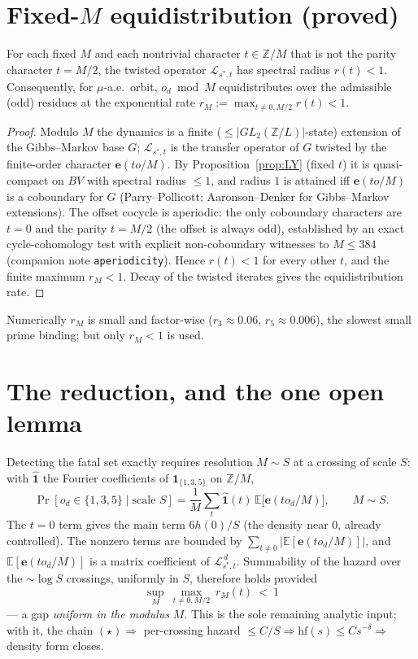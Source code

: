 \documentclass[11pt]{article}
\theoremstyle{definition}\newtheorem{definition}{Definition}
\theoremstyle{remark}\newtheorem{remark}{Remark}
\newcommand{\Z}{\mathbb{Z}}\newcommand{\Rr}{\mathbb{R}}\newcommand{\C}{\mathbb{C}}
\newcommand{\Lop}{\mathcal L}\newcommand{\var}{\operatorname{var}}\newcommand{\e}{\mathbf e}
\begin{document}
\section{Fixed-$M$ equidistribution (proved)}
\begin{proposition}\label{prop:fixedM}
For each fixed $M$ and each nontrivial character $t\in\Z/M$ that is not the
parity character $t=M/2$, the twisted operator $\Lop_{s^\ast,t}$ has spectral
radius $r(t)<1$. Consequently, for $\mu$-a.e.\ orbit, $o_d\bmod M$
equidistributes over the admissible (odd) residues at the exponential rate
$r_M:=\max_{t\neq0,M/2} r(t)<1$.
\end{proposition}
\begin{proof}
Modulo $M$ the dynamics is a finite ($\le|GL_2(\Z/L)|$-state) extension of the
Gibbs--Markov base $G$; $\Lop_{s^\ast,t}$ is the transfer operator of $G$
twisted by the finite-order character $\e(t o/M)$. By
Proposition~\ref{prop:LY} (fixed $t$) it is quasi-compact on $BV$ with
spectral radius $\le1$, and radius $1$ is attained iff $\e(t o/M)$ is a
coboundary for $G$ (Parry--Pollicott; Aaronson--Denker for Gibbs--Markov
extensions). The offset cocycle is aperiodic: the only coboundary characters
are $t=0$ and the parity $t=M/2$ (the offset is always odd), established by an
exact cycle-cohomology test with explicit non-coboundary witnesses to
$M\le384$ (companion note \texttt{aperiodicity}). Hence $r(t)<1$ for every
other $t$, and the finite maximum $r_M<1$. Decay of the twisted iterates gives
the equidistribution rate.
\end{proof}
Numerically $r_M$ is small and factor-wise ($r_3\approx0.06$,
$r_5\approx0.006$), the slowest small prime binding; but only $r_M<1$ is used.

\section{The reduction, and the one open lemma}
Detecting the fatal set exactly requires resolution $M\sim S$ at a crossing of
scale $S$: with $\widehat{\mathbf 1}$ the Fourier coefficients of
$\mathbf 1_{\{1,3,5\}}$ on $\Z/M$,
\[
\Pr[o_d\in\{1,3,5\}\mid \text{scale }S]
=\frac1M\sum_{t}\widehat{\mathbf 1}(t)\,\mathbb E\big[\e(t o_d/M)\big],
\qquad M\sim S.
\]
The $t=0$ term gives the main term $6h(0)/S$ (the density near $0$, already
controlled). The nonzero terms are bounded by $\sum_{t\neq0}
|\mathbb E[\e(t o_d/M)]|$, and $\mathbb E[\e(t o_d/M)]$ is a matrix
coefficient of $\Lop_{s^\ast,t}^{\,d}$. Summability of the hazard over the
$\sim\log S$ crossings, uniformly in $S$, therefore holds provided
\[
\boxed{\ \sup_{M}\ \max_{t\neq0,M/2}\ r_M(t)\ <\ 1\ }
\tag{$\star$}
\]
--- a gap \emph{uniform in the modulus} $M$. This is the sole remaining
analytic input; with it, the chain $(\star)\Rightarrow$ per-crossing hazard
$\le C/S\Rightarrow \mathrm{hf}(s)\le Cs^{-\delta}\Rightarrow$ density form
closes.
\end{document}
